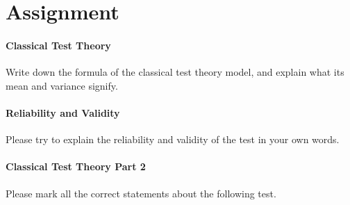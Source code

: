 \documentclass{ltjbook}
\begin{document}
\section{Assignment}
\paragraph{Classical Test Theory} Write down the formula of the classical test theory model, and explain what its mean and variance signify.
\paragraph{Reliability and Validity} Please try to explain the reliability and validity of the test in your own words.
\paragraph{Classical Test Theory Part 2} Please mark all the correct statements about the following test.


\end{document}
